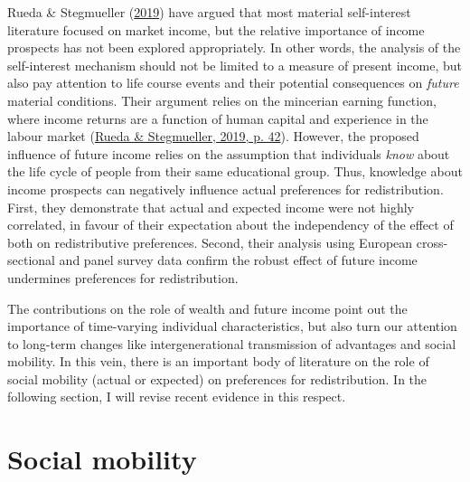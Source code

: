 \documentclass[
  12pt,
]{book}
\begin{document}
Rueda \& Stegmueller (\protect\hyperlink{ref-rueda_who_2019}{2019}) have argued that most material self-interest literature focused on market income, but the relative importance of income prospects has not been explored appropriately. In other words, the analysis of the self-interest mechanism should not be limited to a measure of present income, but also pay attention to life course events and their potential consequences on \emph{future} material conditions. Their argument relies on the mincerian earning function, where income returns are a function of human capital and experience in the labour market (\protect\hyperlink{ref-rueda_who_2019}{Rueda \& Stegmueller, 2019, p. 42}). However, the proposed influence of future income relies on the assumption that individuals \emph{know} about the life cycle of people from their same educational group. Thus, knowledge about income prospects can negatively influence actual preferences for redistribution. First, they demonstrate that actual and expected income were not highly correlated, in favour of their expectation about the independency of the effect of both on redistributive preferences. Second, their analysis using European cross-sectional and panel survey data confirm the robust effect of future income undermines preferences for redistribution.

The contributions on the role of wealth and future income point out the importance of time-varying individual characteristics, but also turn our attention to long-term changes like intergenerational transmission of advantages and social mobility. In this vein, there is an important body of literature on the role of social mobility (actual or expected) on preferences for redistribution. In the following section, I will revise recent evidence in this respect.

\hypertarget{social-mobility}{%
\section{Social mobility}\label{social-mobility}}
\end{document}
